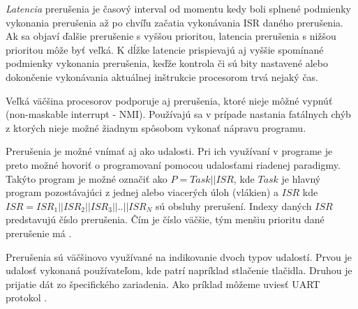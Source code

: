 \textit{Latencia} prerušenia je časový interval od momentu kedy boli splnené podmienky vykonania prerušenia až po chvíľu začatia vykonávania ISR daného prerušenia. Ak sa objaví ďalšie prerušenie s vyššou prioritou, latencia prerušenia s nižšou prioritou môže byť veľká. K dĺžke latencie prispievajú aj vyššie spomínané podmienky vykonania prerušenia, keďže kontrola či sú bity nastavené alebo dokončenie vykonávania aktuálnej inštrukcie procesorom trvá nejaký čas. \par
Veľká väčšina procesorov podporuje aj prerušenia, ktoré nieje môžné vypnúť (non-maskable interrupt - NMI). Používajú sa v prípade nastania fatálnych chýb z ktorých nieje možné žiadnym spôsobom vykonať nápravu programu.
\cite{regehrSafeStructuredUse2007} \par
Prerušenia je možné vnímať aj ako udalosti. Pri ich využívaní v programe je preto možné hovoriť o programovaní pomocou udalosťami riadenej paradigmy. Takýto program je možné označiť ako \begin{math}P=Task || ISR\end{math}, kde \begin{math}Task\end{math} je hlavný program pozostávajúci z jednej alebo viacerých úloh (vlákien) a  \begin{math}ISR\end{math} kde \begin{math}ISR=ISR_1||ISR_2||ISR_3||..||ISR_N\end{math} sú obsluhy prerušení.
Indexy daných \begin{math}ISR\end{math} predstavujú číslo prerušenia. Čím je číslo väčšie, tým menšiu prioritu dané prerušenie má \cite{wangAutomaticDetectionValidation2017}. \par Prerušenia sú väčšinovo využívané na indikovanie dvoch typov udalostí. Prvou je udalosť vykonaná používateľom, kde patrí napríklad stlačenie tlačidla. Druhou je prijatie dát zo špecifického zariadenia. Ako príklad môžeme uviesť UART protokol \cite{wangAutomaticDetectionValidation2017}.